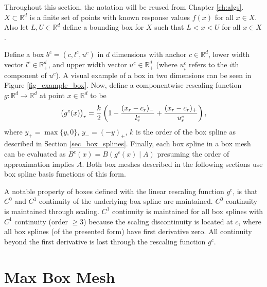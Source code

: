 Throughout this section, the notation will be reused from Chapter \ref{ch:algs}. $X \subset \mathbb{R}^d$ is a finite set of points with known response values $f(x)$ for all $x \in X$. Also let $L,U \in \mathbb{R}^d$ define a bounding box for $X$ such that $L < x < U$ for all $x \in X$.

Define a box $b^c = (c,l^c,u^c)$ in $d$ dimensions with anchor $c \in \mathbb{R}^d$, lower width vector $l^c \in \mathbb{R}^d_+$, and upper width vector $u^c \in \mathbb{R}^d_+$ (where $u^c_i$ refers to the $i$th component of $u^c$). A visual example of a box in two dimensions can be seen in Figure \ref{fig_example_box}. Now, define a componentwise rescaling function $g: \mathbb{R}^d \rightarrow \mathbb{R}^d$ at point $x \in \mathbb{R}^d$ to be
\begin{equation}
  \bigl(g^c(x)\bigr)_r = {k \over 2} \left( 1 - {(x_r - c_r)_- \over l^c_r} + {(x_r - c_r)_+ \over u^c_r} \right),
\end{equation}
where $y_+=\max\{y,0\}$, $y_-=(-y)_+$, $k$ is the order of the box spline as described in Section \ref{sec_box_splines}. Finally, each box spline in a box mesh can be evaluated as $B^c(x) = B(g^c(x) \mid A)$ presuming the order of approximation implies $A$. Both box meshes described in the following sections use box spline basis functions of this form.

A notable property of boxes defined with the linear rescaling function $g^c$, is that $C^0$ and $C^1$ continuity of the underlying box spline are maintained. $C^0$ continuity is maintained through scaling. $C^1$ continuity is maintained for all box splines with $C^1$ continuity (order $\geq 3$) because the scaling discontinuity is located at $c$, where all box splines (of the presented form) have first derivative zero. All continuity beyond the first derivative is lost through the rescaling function $g^c$.

\section{Max Box Mesh}

